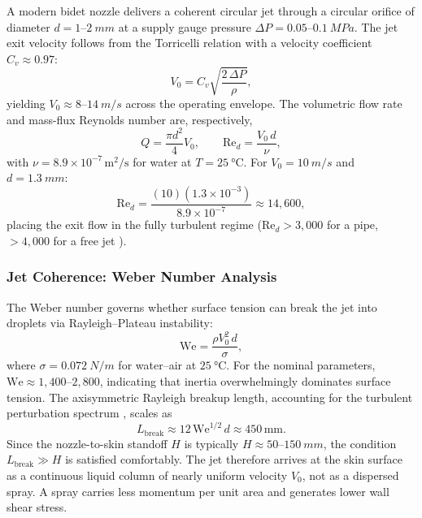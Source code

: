 \documentclass[aps,prfluids,reprint,amsmath,amssymb,floatfix]{revtex4-2}
\newcommand{\Rey}{\mathrm{Re}}
\newcommand{\We}{\mathrm{We}}
\begin{document}
A modern bidet nozzle delivers a coherent circular jet through a circular
orifice of diameter $d = 1$--$\SI{2}{mm}$ at a supply gauge pressure
$\Delta P = 0.05$--$\SI{0.1}{MPa}$. The jet exit velocity follows from the
Torricelli relation with a velocity coefficient $C_v \approx 0.97$:
\begin{equation}
    V_0 = C_v \sqrt{\frac{2\,\Delta P}{\rho}},
    \label{eq:torricelli}
\end{equation}
yielding $V_0 \approx 8$--$\SI{14}{m/s}$ across the operating envelope.
The volumetric flow rate and mass-flux Reynolds number are, respectively,
\begin{equation}
    Q = \frac{\pi d^2}{4} V_0, \qquad
    \Rey_d = \frac{V_0\,d}{\nu},
    \label{eq:reynolds}
\end{equation}
with $\nu = 8.9 \times 10^{-7}\,\mathrm{m^2/s}$ for water at
$T = \SI{25}{\celsius}$. For $V_0 = \SI{10}{m/s}$ and $d = \SI{1.3}{mm}$:
\begin{equation}
    \Rey_d = \frac{(10)(1.3 \times 10^{-3})}{8.9 \times 10^{-7}}
    \approx 14{,}600,
\end{equation}
placing the exit flow in the fully turbulent regime ($\Rey_d > 3{,}000$
for a pipe, $>4{,}000$ for a free jet \citep{ZuckermanLior2006}).

\subsubsection{Jet Coherence: Weber Number Analysis}

The Weber number governs whether surface tension can break the jet into
droplets via Rayleigh--Plateau instability:
\begin{equation}
    \We = \frac{\rho V_0^2\,d}{\sigma},
    \label{eq:weber}
\end{equation}
where $\sigma = \SI{0.072}{N/m}$ for water--air at $\SI{25}{\celsius}$.
For the nominal parameters, $\We \approx 1{,}400$--$2{,}800$, indicating
that inertia overwhelmingly dominates surface tension. The axisymmetric
Rayleigh breakup length, accounting for the turbulent perturbation spectrum
\citep{Lefebvre1988}, scales as
\begin{equation}
    L_\mathrm{break} \approx 12\,\We^{1/2}\,d \approx 450\,\mathrm{mm}.
    \label{eq:breakup}
\end{equation}
Since the nozzle-to-skin standoff $H$ is typically $H \approx 50$--$\SI{150}{mm}$,
the condition $L_\mathrm{break} \gg H$ is satisfied comfortably. The jet
therefore arrives at the skin surface as a continuous liquid column of
nearly uniform velocity $V_0$, not as a dispersed spray. A spray carries
less momentum per unit area and generates lower wall shear stress.
\end{document}

